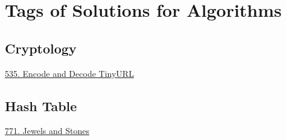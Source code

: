 \section*{Tags of Solutions for Algorithms}
\label{sec:algo_tag}

\subsection*{Cryptology}
\hyperref[algo:535]{535. Encode and Decode TinyURL}

\subsection*{Hash Table}
\hyperref[algo:771]{771. Jewels and Stones}
